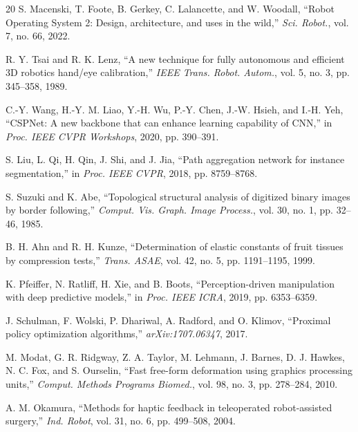 \documentclass[journal]{IEEEtran}
\begin{document}
\begin{thebibliography}{20}
S. Macenski, T. Foote, B. Gerkey, C. Lalancette, and W. Woodall, ``Robot Operating System 2: Design, architecture, and uses in the wild,'' \textit{Sci. Robot.}, vol. 7, no. 66, 2022.

R. Y. Tsai and R. K. Lenz, ``A new technique for fully autonomous and efficient 3D robotics hand/eye calibration,'' \textit{IEEE Trans. Robot. Autom.}, vol. 5, no. 3, pp. 345--358, 1989.

C.-Y. Wang, H.-Y. M. Liao, Y.-H. Wu, P.-Y. Chen, J.-W. Hsieh, and I.-H. Yeh, ``CSPNet: A new backbone that can enhance learning capability of CNN,'' in \textit{Proc. IEEE CVPR Workshops}, 2020, pp. 390--391.

S. Liu, L. Qi, H. Qin, J. Shi, and J. Jia, ``Path aggregation network for instance segmentation,'' in \textit{Proc. IEEE CVPR}, 2018, pp. 8759--8768.

S. Suzuki and K. Abe, ``Topological structural analysis of digitized binary images by border following,'' \textit{Comput. Vis. Graph. Image Process.}, vol. 30, no. 1, pp. 32--46, 1985.

B. H. Ahn and R. H. Kunze, ``Determination of elastic constants of fruit tissues by compression tests,'' \textit{Trans. ASAE}, vol. 42, no. 5, pp. 1191--1195, 1999.

K. Pfeiffer, N. Ratliff, H. Xie, and B. Boots, ``Perception-driven manipulation with deep predictive models,'' in \textit{Proc. IEEE ICRA}, 2019, pp. 6353--6359.

J. Schulman, F. Wolski, P. Dhariwal, A. Radford, and O. Klimov, ``Proximal policy optimization algorithms,'' \textit{arXiv:1707.06347}, 2017.

M. Modat, G. R. Ridgway, Z. A. Taylor, M. Lehmann, J. Barnes, D. J. Hawkes, N. C. Fox, and S. Ourselin, ``Fast free-form deformation using graphics processing units,'' \textit{Comput. Methods Programs Biomed.}, vol. 98, no. 3, pp. 278--284, 2010.

A. M. Okamura, ``Methods for haptic feedback in teleoperated robot-assisted surgery,'' \textit{Ind. Robot}, vol. 31, no. 6, pp. 499--508, 2004.

\end{thebibliography}
\end{document}
